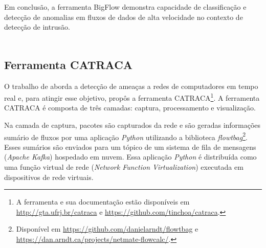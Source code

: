 Em conclusão, a ferramenta BigFlow demonstra capacidade de classificação e
detecção de anomalias em fluxos de dados de alta velocidade no contexto de
detecção de intrusão.
\\
\\


\subsection{Ferramenta CATRACA}

O trabalho de  aborda a detecção de ameaças a redes de
computadores em tempo real e, para atingir esse objetivo, propôs a ferramenta
CATRACA\footnote{
    A ferramenta e sua documentação estão disponíveis em
    \url{http://gta.ufrj.br/catraca}
    e \url{https://github.com/tinchoa/catraca}.
}.
A ferramenta CATRACA é composta de três camadas: captura, processamento e
visualização.



Na camada de captura, pacotes são capturados da rede e 
são geradas informações sumário de fluxos
por uma aplicação \emph{Python} utilizando a biblioteca \emph{flowtbag}\footnote{
    Disponível em \url{https://github.com/danielarndt/flowtbag} e
    \url{https://dan.arndt.ca/projects/netmate-flowcalc/}.
}.
Esses sumários são enviados para um tópico de um sistema de fila de mensagens
(\emph{Apache Kafka}) hospedado em nuvem.
Essa aplicação \emph{Python} é distribuída como uma função virtual de rede
(\emph{Network Function Virtualization}) executada em dispositivos de rede
virtuais.

